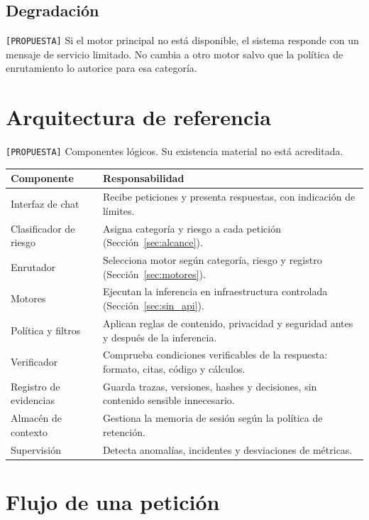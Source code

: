 \documentclass[12pt]{article}
\begin{document}
\subsection{Degradación}

\texttt{[PROPUESTA]} Si el motor principal no está disponible, el sistema
responde con un mensaje de servicio limitado. No cambia a otro motor salvo
que la política de enrutamiento lo autorice para esa categoría.

\section{Arquitectura de referencia}
\label{sec:arquitectura}

\texttt{[PROPUESTA]} Componentes lógicos. Su existencia material no está acreditada.

\begin{longtable}{|p{3.6cm}|p{10.6cm}|}
\hline
\textbf{Componente} & \textbf{Responsabilidad} \\
\hline
\endhead
Interfaz de chat & Recibe peticiones y presenta respuestas, con indicación de límites. \\
\hline
Clasificador de riesgo & Asigna categoría y riesgo a cada petición (Sección~\ref{sec:alcance}). \\
\hline
Enrutador & Selecciona motor según categoría, riesgo y registro (Sección~\ref{sec:motores}). \\
\hline
Motores & Ejecutan la inferencia en infraestructura controlada (Sección~\ref{sec:sin_api}). \\
\hline
Política y filtros & Aplican reglas de contenido, privacidad y seguridad antes y después de la inferencia. \\
\hline
Verificador & Comprueba condiciones verificables de la respuesta: formato, citas, código y cálculos. \\
\hline
Registro de evidencias & Guarda trazas, versiones, hashes y decisiones, sin contenido sensible innecesario. \\
\hline
Almacén de contexto & Gestiona la memoria de sesión según la política de retención. \\
\hline
Supervisión & Detecta anomalías, incidentes y desviaciones de métricas. \\
\hline
\end{longtable}

\section{Flujo de una petición}
\label{sec:flujo}
\end{document}
